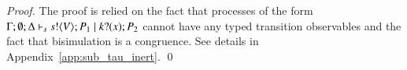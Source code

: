 \begin{proof}
	The proof is relied on the fact that processes of the
	form $\Gamma; \emptyset; \Delta \vdash_s s ! \langle V \rangle ; P_1 \;|\; k ? (x) ; P_2$
	cannot have any typed transition observables and the fact
	that bisimulation is a congruence.
	See details in Appendix~\ref{app:sub_tau_inert}.
	\qed
\end{proof}


